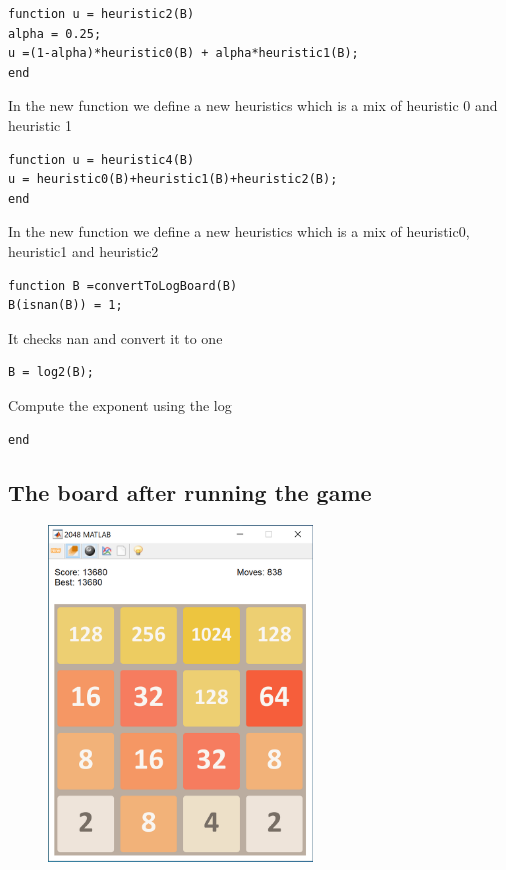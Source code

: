 \documentclass{article}
\begin{document}
\begin{tcolorbox}
\begin{verbatim}
function u = heuristic2(B)
alpha = 0.25;
u =(1-alpha)*heuristic0(B) + alpha*heuristic1(B);
end
\end{verbatim}
\end{tcolorbox}
In the new function we define a new heuristics which is a mix of heuristic 0 and heuristic 1

\begin{tcolorbox}
\begin{verbatim}
function u = heuristic4(B)
u = heuristic0(B)+heuristic1(B)+heuristic2(B);
end
\end{verbatim}
\end{tcolorbox}
In the new function we define a new heuristics which is a mix of heuristic0, heuristic1 and heuristic2

\begin{tcolorbox}
\begin{verbatim}
function B =convertToLogBoard(B)
B(isnan(B)) = 1;
\end{verbatim}
\end{tcolorbox}
It checks nan and convert it to one

\begin{tcolorbox}
\begin{verbatim}
B = log2(B);
\end{verbatim}
\end{tcolorbox}
Compute the exponent using the log

\begin{tcolorbox}
\begin{verbatim}
end
\end{verbatim}
\end{tcolorbox}

\subsection{The board after running the game}

\begin{figure}[h!]
\centering
\includegraphics[width=7cm]{proj.png}
\label{fig:MyAI4 results}
\end{figure}
\end{document}
